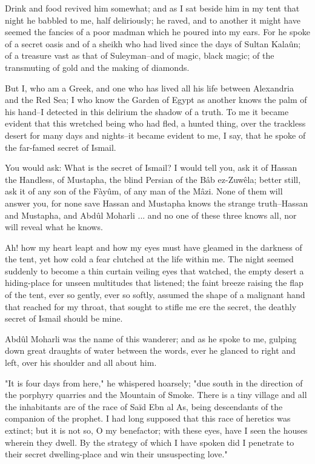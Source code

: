 Drink and food revived him somewhat; and as I sat beside him in my
tent that night he babbled to me, half deliriously; he raved, and to
another it might have seemed the fancies of a poor madman which he
poured into my ears. For he spoke of a secret oasis and of a sheikh
who had lived since the days of Sultan Kalaûn; of a treasure vast as
that of Suleyman--and of magic, black magic; of the transmuting of
gold and the making of diamonds.

But I, who am a Greek, and one who has lived all his life between
Alexandria and the Red Sea; I who know the Garden of Egypt as another
knows the palm of his hand--I detected in this delirium the shadow of
a truth. To me it became evident that this wretched being who had
fled, a hunted thing, over the trackless desert for many days and
nights--it became evident to me, I say, that he spoke of the far-famed
secret of Ismail.

You would ask: What is the secret of Ismail? I would tell you, ask it
of Hassan the Handless, of Mustapha, the blind Persian of the Bâb
ez-Zuwêla; better still, ask it of any son of the Fàyûm, of any man of
the Mâzi. None of them will answer you, for none save Hassan and
Mustapha knows the strange truth--Hassan and Mustapha, and Abdûl
Moharli ... and no one of these three knows all, nor will reveal what
he knows.

Ah! how my heart leapt and how my eyes must have gleamed in the
darkness of the tent, yet how cold a fear clutched at the life within
me. The night seemed suddenly to become a thin curtain veiling eyes
that watched, the empty desert a hiding-place for unseen multitudes
that listened; the faint breeze raising the flap of the tent, ever so
gently, ever so softly, assumed the shape of a malignant hand that
reached for my throat, that sought to stifle me ere the secret, the
deathly secret of Ismail should be mine.

Abdûl Moharli was the name of this wanderer; and as he spoke to me,
gulping down great draughts of water between the words, ever he
glanced to right and left, over his shoulder and all about him.

"It is four days from here," he whispered hoarsely; "due south in the
direction of the porphyry quarries and the Mountain of Smoke. There
is a tiny village and all the inhabitants are of the race of Saïd Ebn
al As, being descendants of the companion of the prophet. I had long
supposed that this race of heretics was extinct; but it is not so, O
my benefactor; with these eyes, have I seen the houses wherein they
dwell. By the strategy of which I have spoken did I penetrate to their
secret dwelling-place and win their unsuspecting love."

